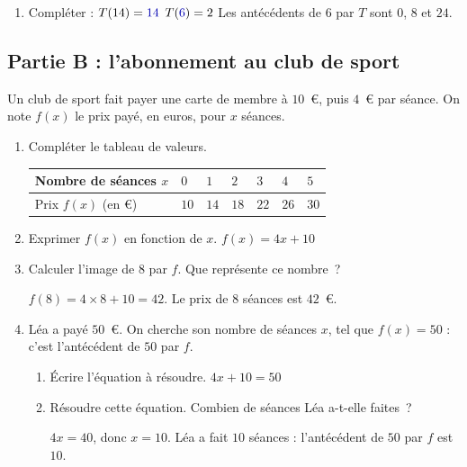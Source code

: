 \documentclass{article}
\newcommand{\rep}[1]{\textcolor{blue!70!black}{#1}}
\begin{document}
\begin{enumerate}[resume]
  \item Compléter : \quad $T(14) = \rep{14}$ \qquad $T(\rep{6}) = 2$ \qquad Les antécédents de $6$ par $T$ sont \rep{$0$, $8$ et $24$}.
\end{enumerate}

\subsection*{Partie B : l'abonnement au club de sport}

Un club de sport fait payer une carte de membre à $10$~€, puis $4$~€ par séance. On note $f(x)$ le prix payé, en euros, pour $x$ séances.

\begin{enumerate}[resume]
  \item Compléter le tableau de valeurs.

  \begin{center}
    \renewcommand{\arraystretch}{1.3}
    \begin{tabular}{|C{4.2cm}|*{6}{C{1.4cm}|}}
      \hline
      Nombre de séances $x$ & $0$ & $1$ & $2$ & $3$ & $4$ & $5$ \\ \hline
      Prix $f(x)$ (en €) & \rep{$10$} & \rep{$14$} & \rep{$18$} & \rep{$22$} & \rep{$26$} & \rep{$30$} \\ \hline
    \end{tabular}
  \end{center}

  \item Exprimer $f(x)$ en fonction de $x$. \rep{$f(x) = 4x + 10$}

  \item Calculer l'image de $8$ par $f$. Que représente ce nombre~?

  \rep{$f(8) = 4 \times 8 + 10 = 42$. Le prix de 8 séances est $42$~€.}

  \item Léa a payé $50$~€. On cherche son nombre de séances $x$, tel que $f(x) = 50$ : c'est l'antécédent de $50$ par $f$.
  \begin{enumerate}[label=\alph*.]
    \item Écrire l'équation à résoudre. \rep{$4x + 10 = 50$}

    \item Résoudre cette équation. Combien de séances Léa a-t-elle faites~?

    \rep{$4x = 40$, donc $x = 10$. Léa a fait $10$ séances : l'antécédent de $50$ par $f$ est $10$.}
  \end{enumerate}
\end{enumerate}
\end{document}
